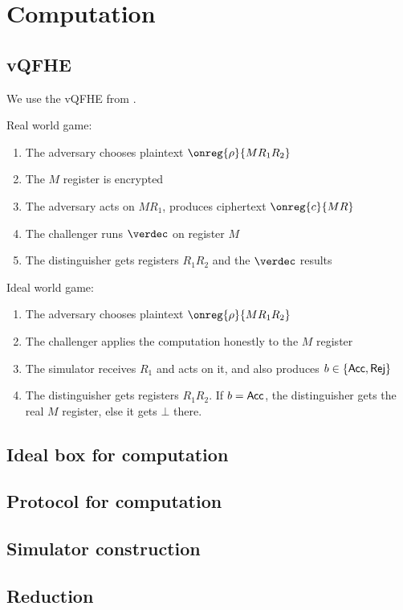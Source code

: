 \section{Computation}


\subsection{vQFHE}

We use the vQFHE from \cite{magic_circuits}.



Real world game:
\begin{enumerate}
	\item The adversary chooses plaintext $\onreg{\rho}{MR_1R_2}$
	\item The $M$ register is encrypted
	\item The adversary acts on $MR_1$, produces ciphertext $\onreg{c}{MR}$
	\item The challenger runs $\verdec$ on register $M$
	\item The distinguisher gets registers $R_1R_2$ and the $\verdec$ results
\end{enumerate}

Ideal world game:
\begin{enumerate}
	\item The adversary chooses plaintext $\onreg{\rho}{MR_1R_2}$
	\item The challenger applies the computation honestly to the $M$ register
	\item The simulator receives $R_1$ and acts on it, and also produces $b\in\left\{{\mathsf{Acc}}, {\mathsf{Rej}}\right\}$
	\item The distinguisher gets registers $R_1R_2$. If $b={\mathsf{Acc}}$, the distinguisher gets the real $M$ register, else it gets $\bot$ there.
\end{enumerate}

\subsection{Ideal box for computation}

\subsection{Protocol for computation}

\subsection{Simulator construction}

\subsection{Reduction}

